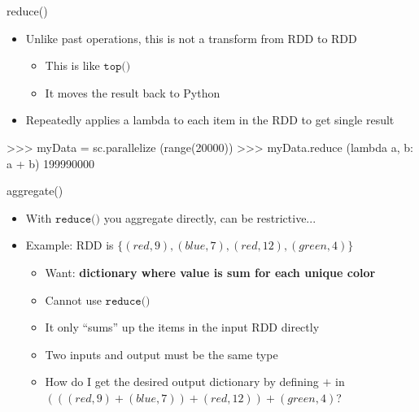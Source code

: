 \documentclass[aspectratio=169]{beamer}
\begin{document}
%
%
\begin{frame}[fragile]{reduce()}

\begin{itemize}
\item Unlike past operations, this is not a transform from RDD to RDD
	\begin{itemize}
	\item This is like $\texttt{top()}$
	\item It moves the result back to Python
	\end{itemize}
\item Repeatedly applies a lambda to each item in the RDD to get single result
\end{itemize}

\begin{SQL}
>>> myData = sc.parallelize (range(20000))
>>> myData.reduce (lambda a, b: a + b)
199990000
\end{SQL}
\end{frame}
\begin{frame}{aggregate()}

\begin{itemize}
\item With $\texttt{reduce()}$ you aggregate directly, can be restrictive...
\item Example: RDD is $\{(red, 9), (blue, 7), (red, 12), (green, 4)\}$
	\begin{itemize}
	\item Want: \textbf{dictionary where value is sum for each unique color}
	\item Cannot use $\texttt{reduce()}$
	\item It only ``sums'' up the items in the input RDD directly
	\item Two inputs and output must be the same type
	\item How do I get the desired output dictionary by defining $+$ in $(((red, 9) + (blue, 7)) + (red, 12)) + (green, 4)$?
	\end{itemize}
\end{itemize}
\end{frame}
\end{document}
